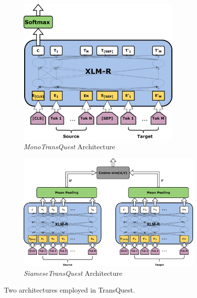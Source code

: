 \begin{figure}[!ht]
	\centering
	\begin{subfigure}[b]{10cm}
		\centering\includegraphics[width=8cm]{figures/translation_quality_estimation/transquest/TransQuest.png}
		\caption{\textit{MonoTransQuest} Architecture}
		\label{fig:monotransquest}
	\end{subfigure}
	\begin{subfigure}[b]{10cm}
		\centering\includegraphics[width=12cm]{figures/translation_quality_estimation/transquest/SiameseTransQuest.png}
		\caption{\textit{SiameseTransQuest} Architecture}
		\label{fig:siamesetransquest}
	\end{subfigure}
	
	\caption[Architectures in TransQuest]{Two architectures employed in TransQuest.}
	\label{fig:transquest_architecture}
\end{figure}

